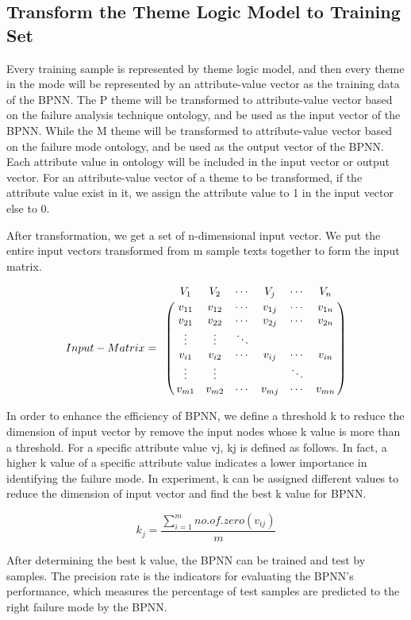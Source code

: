 \documentclass{elsarticle}
\begin{document}
\subsection{Transform the Theme Logic Model to Training Set}
\label{sec:transf-theme-logic}

Every training sample is represented by theme logic model, and then every theme in the mode will be represented by an attribute-value vector as the training data of the BPNN. The P theme will be transformed to attribute-value vector based on the failure analysis technique ontology, and be used as the input vector of the BPNN. While the M theme will be transformed to attribute-value vector based on the failure mode ontology, and be used as the output vector of the BPNN. Each attribute value in ontology will be included in the input vector or output vector. For an attribute-value vector of a theme to be transformed, if the attribute value exist in it, we assign the attribute value to 1 in the input vector else to 0. 

After transformation, we get a set of n-dimensional input vector. We put the entire input vectors transformed from m sample texts together to form the input matrix. 

\[
Input - Matrix = \bordermatrix{%
& V_1 & V_2 & \cdots & V_j & \cdots & V_n \cr
& v_{11} & v_{12} & \cdots & v_{1j} &  \cdots & v_{1n} \cr
& v_{21} & v_{22} & \cdots & v_{2j} &   \cdots & v_{2n} \cr
& \vdots & \vdots & \ddots  \cr
& v_{i1} & v_{i2} & \cdots & v_{ij} & \cdots & v_{in} \cr
& \vdots & \vdots & &  & \ddots  \cr
& v_{m1} & v_{m2} & \cdots & v_{mj} & \cdots & v_{mn} \cr
}
\]

In order to enhance the efficiency of BPNN, we define a threshold k to reduce the dimension of input vector by remove the input nodes whose k value is more than a threshold. For a specific attribute value vj, kj is defined as follows. In fact, a higher k value of a specific attribute value indicates a lower importance in identifying the failure mode. In experiment, k can be assigned different values to reduce the dimension of input vector and find the best k value for BPNN.

\[k_j = \frac{\sum_{i=1}^{m}no.of.zero(v_{ij})}{m}\]

After determining the best k value, the BPNN can be trained and test by samples. The precision rate is the indicators for evaluating the BPNN’s performance, which measures the percentage of test samples are predicted to the right failure mode by the BPNN. 
\end{document}
